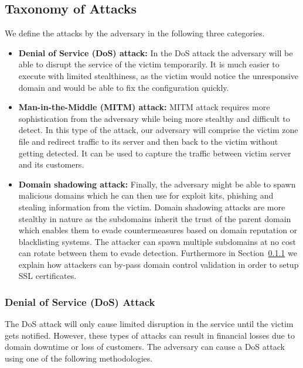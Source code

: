 \subsection{Taxonomy of Attacks}
We define the attacks by the adversary in the following three categories. 

\begin{itemize}
\item \textbf{Denial of Service (DoS) attack:} In the DoS attack the adversary will be able to disrupt the service of the victim temporarily. It is much easier to execute with limited stealthiness, as the victim would notice the unresponsive domain and would be able to fix the configuration quickly. 


\item \textbf{Man-in-the-Middle (MITM) attack:} MITM attack requires more sophistication from the adversary while being more stealthy and difficult to detect. In this type of the attack, our adversary will comprise the victim zone file and redirect traffic to its server and then back to the victim without getting detected. It can be used to capture the traffic between victim server and its customers.  

\item \textbf{Domain shadowing attack:} Finally, the adversary might be able to spawn malicious domains which he can then use for exploit kits, phishing and stealing information from the victim. Domain shadowing attacks are more stealthy in nature as the subdomains inherit the trust of the parent domain which enables them to evade countermeasures based on domain reputation or blacklisting systems. The attacker can spawn multiple subdomains at no cost can rotate between them to evade detection. Furthermore in Section~\ref{} we explain how attackers can by-pass domain control validation in order to setup SSL certificates. 
\end{itemize}



\subsubsection{Denial of Service (DoS) Attack} 
The DoS attack will only cause limited disruption in the service until the victim gets notified. However, these types of attacks can result in financial losses due to domain downtime or loss of customers. The adversary can cause a DoS attack using one of the following methodologies. 

